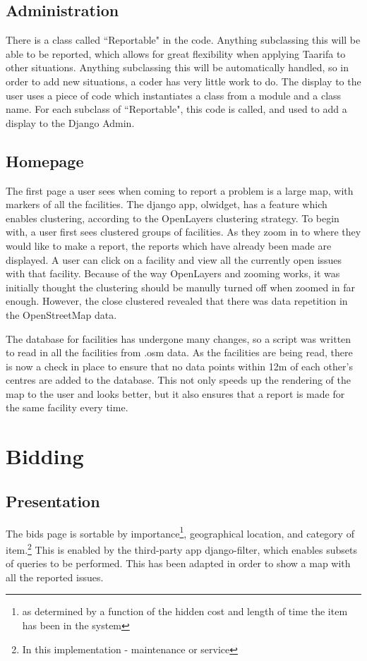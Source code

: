 \subsection{Administration}
There is a class called ``Reportable" in the code. Anything subclassing this will be able to be reported, which allows for great flexibility when applying Taarifa to other situations. Anything subclassing this will be automatically handled, so in order to add new situations, a coder has very little work to do. The display to the user uses a piece of code which instantiates a class from a module and a class name. For each subclass of ``Reportable", this code is called, and used to add a display to the Django Admin.

\subsection{Homepage}
The first page a user sees when coming to report a problem is a large map, with markers of all the facilities. The django app, olwidget, has a feature which enables clustering, according to the OpenLayers clustering strategy. To begin with, a user first sees clustered groups of facilities. As they zoom in to where they would like to make a report, the reports which have already been made are displayed. A user can click on a facility and view all the currently open issues with that facility. Because of the way OpenLayers and zooming works, it was initially thought the clustering should be manully turned off when zoomed in far enough. However, the close clustered revealed that there was data repetition in the OpenStreetMap data.

The database for facilities has undergone many changes, so a script was written to read in all the facilities from .osm data. As the facilities are being read, there is now a check in place to ensure that no data points within 12m of each other's centres are added to the database. This not only speeds up the rendering of the map to the user and looks better, but it also ensures that a report is made for the same facility every time.

\section{Bidding}

\subsection{Presentation}
The bids page is sortable by importance\footnote{as determined by a function of the hidden cost and length of time the item has been in the system}, geographical location, and category of item.\footnote{In this implementation - maintenance or service} This is enabled by the third-party app django-filter, which enables subsets of queries to be performed. This has been adapted in order to show a map with all the reported issues.


